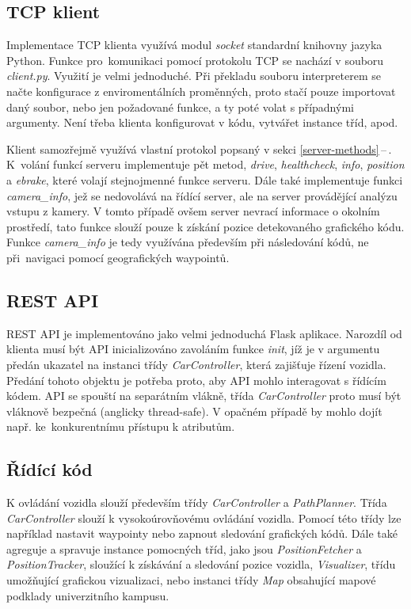 \documentclass[czech, bachelor]{diploma}
\newcommand{\peteref}[1]{\ref{#1}\,--\,\nameref{#1}}
\begin{document}
\subsection{TCP klient}

Implementace TCP klienta využívá modul \emph{socket} standardní knihovny jazyka Python. Funkce pro~komunikaci pomocí protokolu TCP
se nachází v souboru \emph{client.py}. Využití je velmi jednoduché. Při překladu souboru interpreterem se načte konfigurace
z enviromentálních proměnných, proto stačí pouze importovat daný soubor, nebo jen požadované funkce, a ty poté volat s případnými
argumenty. Není třeba klienta konfigurovat v kódu, vytvářet instance tříd, apod.

Klient samozřejmě využívá vlastní protokol popsaný v sekci \peteref{server-methods}. K~volání funkcí serveru implementuje pět
metod, \emph{drive}, \emph{healthcheck}, \emph{info}, \emph{position} a \emph{ebrake}, které volají stejnojmenné funkce serveru.
Dále také implementuje funkci \emph{camera\_info}, jež se nedovolává na řídící server, ale na server provádějící analýzu vstupu
z kamery. V tomto případě ovšem server nevrací informace o okolním prostředí, tato funkce slouží pouze k získání pozice
detekovaného grafického kódu. Funkce \emph{camera\_info} je tedy využívána především při následování kódů, ne při~navigaci pomocí
geografických waypointů.

\subsection{REST API}

REST API je implementováno jako velmi jednoduchá Flask\cite{flask-source} aplikace. Narozdíl od klienta musí být API
inicializováno zavoláním funkce \emph{init}, jíž je v argumentu předán ukazatel na instanci třídy \emph{CarController}, která
zajišťuje řízení vozidla. Předání tohoto objektu je potřeba proto, aby API mohlo interagovat s řídícím kódem. API se spouští
na separátním vlákně, třída \emph{CarController} proto musí být vláknově bezpečná (anglicky thread-safe). V opačném případě
by mohlo dojít např. ke~konkurentnímu přístupu k atributům.

\subsection{Řídící kód}

K ovládání vozidla slouží především třídy \emph{CarController} a \emph{PathPlanner}. Třída \emph{CarController} slouží
k vysokoúrovňovému ovládání vozidla. Pomocí této třídy lze například nastavit waypointy nebo zapnout sledování grafických kódů.
Dále také agreguje a spravuje instance pomocných tříd, jako jsou \emph{PositionFetcher} a \emph{PositionTracker}, sloužící
k získávání a sledování pozice vozidla, \emph{Visualizer}, třídu umožňující grafickou vizualizaci, nebo instanci třídy \emph{Map}
obsahující mapové podklady univerzitního kampusu.
\end{document}
